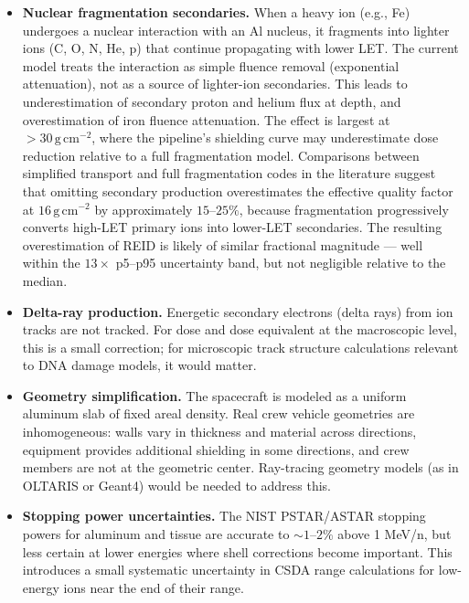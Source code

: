\begin{itemize}
  \item \textbf{Nuclear fragmentation secondaries.}
        When a heavy ion (e.g., Fe) undergoes a nuclear interaction with
        an Al nucleus, it fragments into lighter ions (C, O, N, He, p)
        that continue propagating with lower LET.
        The current model treats the interaction as simple fluence removal
        (exponential attenuation), not as a source of lighter-ion secondaries.
        This leads to underestimation of secondary proton and helium flux
        at depth, and overestimation of iron fluence attenuation.
        The effect is largest at $>30\,\mathrm{g\,cm^{-2}}$, where the
        pipeline's shielding curve may underestimate dose reduction
        relative to a full fragmentation model.
        Comparisons between simplified transport and full fragmentation
        codes in the literature \citep{wilson1991, slaba2014} suggest
        that omitting secondary production overestimates the effective
        quality factor at $16\,\mathrm{g\,cm^{-2}}$ by approximately
        $15$--$25\%$, because fragmentation progressively converts
        high-LET primary ions into lower-LET secondaries.
        The resulting overestimation of REID is likely of similar
        fractional magnitude — well within the $13\times$ p5--p95
        uncertainty band, but not negligible relative to the median.

  \item \textbf{Delta-ray production.}
        Energetic secondary electrons (delta rays) from ion tracks are not
        tracked. For dose and dose equivalent at the macroscopic level,
        this is a small correction; for microscopic track structure
        calculations relevant to DNA damage models, it would matter.

  \item \textbf{Geometry simplification.}
        The spacecraft is modeled as a uniform aluminum slab of fixed
        areal density.
        Real crew vehicle geometries are inhomogeneous: walls vary in
        thickness and material across directions, equipment provides
        additional shielding in some directions, and crew members are
        not at the geometric center.
        Ray-tracing geometry models (as in OLTARIS or Geant4) would be
        needed to address this.

  \item \textbf{Stopping power uncertainties.}
        The NIST PSTAR/ASTAR stopping powers for aluminum and tissue are
        accurate to $\sim\!1$--$2\%$ above 1 MeV/n, but less certain at
        lower energies where shell corrections become important.
        This introduces a small systematic uncertainty in CSDA range
        calculations for low-energy ions near the end of their range.
\end{itemize}

